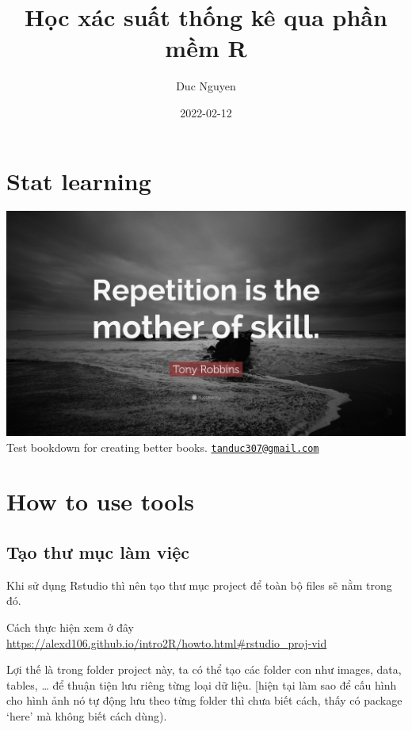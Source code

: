 \documentclass[
]{book}
\title{Học xác suất thống kê qua phần mềm R}
\author{Duc Nguyen}
\date{2022-02-12}
\begin{document}
\maketitle

{
\setcounter{tocdepth}{1}
\tableofcontents
}
\hypertarget{stat-learning}{%
\chapter{Stat learning}\label{stat-learning}}

\includegraphics[width=1\textwidth,height=\textheight]{images/Quotefancy-237580-3840x2160.jpg}
Test bookdown for creating better books.
\href{mailto:tanduc307@gmail.com}{\nolinkurl{tanduc307@gmail.com}}

\hypertarget{how-to-use-tools}{%
\chapter{How to use tools}\label{how-to-use-tools}}

\hypertarget{tux1ea1o-thux1b0-mux1ee5c-luxe0m-viux1ec7c}{%
\section{Tạo thư mục làm việc}\label{tux1ea1o-thux1b0-mux1ee5c-luxe0m-viux1ec7c}}

Khi sử dụng Rstudio thì nên tạo thư mục project để toàn bộ files sẽ nằm trong đó.

Cách thực hiện xem ở đây \url{https://alexd106.github.io/intro2R/howto.html\#rstudio_proj-vid}

Lợi thế là trong folder project này, ta có thể tạo các folder con như images, data, tables, \ldots{} để thuận tiện lưu riêng từng loại dữ liệu. {[}hiện tại làm sao để cấu hình cho hình ảnh nó tự động lưu theo từng folder thì chưa biết cách, thấy có package `here' mà không biết cách dùng).
\end{document}

